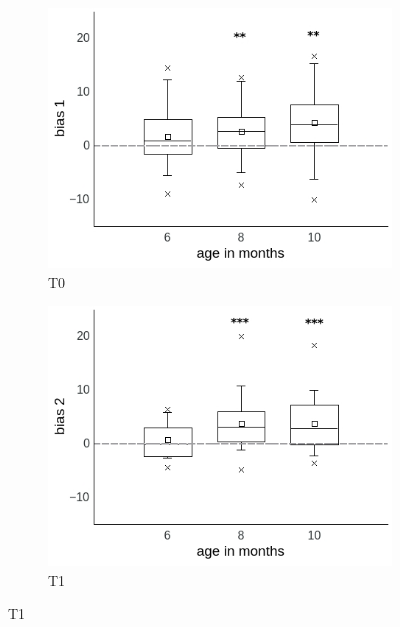 \documentclass[a4paper]{scrreprt}
\begin{document}
\begin{figure}
\centering
    \begin{subfigure}[b]{0.49\textwidth}
        \includegraphics[width=\textwidth]{figs/sec3/age/age_diff1_mod1.jpeg}
        \caption{T0}
    \end{subfigure}
\begin{subfigure}[b]{0.49\textwidth}
        \includegraphics[width=\textwidth]{figs/sec3/age/age_diff2_mod1.jpeg}
        \caption{T1}
    \end{subfigure}
    

\end{figure}
\end{document}

